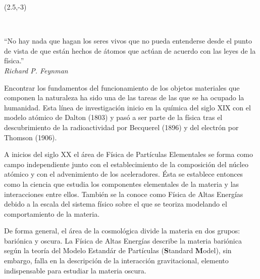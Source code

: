 \begin{textblock}{9}(2.5,-3)
\begin{flushright}
\setlength{\baselineskip}{15pt}
~

``No hay nada que hagan los seres vivos que no pueda entenderse desde el punto de vista de que están hechos de átomos que actúan de acuerdo con las leyes de la física.''\\[.5cm]
\textit{Richard P. Feynman}
\end{flushright}
\end{textblock}


Encontrar los fundamentos del funcionamiento de los objetos materiales que componen la naturaleza ha sido una de las tareas de las que se ha ocupado la humanidad. Esta línea de investigación inicio en la química del siglo XIX con el modelo atómico de Dalton (1803) y pasó a ser parte de la física tras el descubrimiento de la radioactividad por %
Becquerel (1896) y del electrón por Thomson (1906).

A inicios del siglo XX el área de Física de Partículas Elementales se forma como campo independiente junto con el establecimiento de la composición del núcleo atómico y con el advenimiento de los aceleradores. Ésta se establece entonces como la ciencia que estudia los componentes elementales de la materia y las interacciones entre ellos. También se la conoce como Física de Altas Energías debido a la escala del sistema físico sobre el que se teoriza modelando el comportamiento de la materia.

De forma general, el área de la cosmológica divide la materia en dos grupos: bariónica y oscura. La Física de Altas Energías describe la materia bariónica según la teoría del Modelo Estandár de Partículas \ME(\textbf{S}tandard \textbf{M}odel), sin embargo, falla en la descripción de la interacción gravitacional, elemento indispensable para estudiar la materia oscura.
